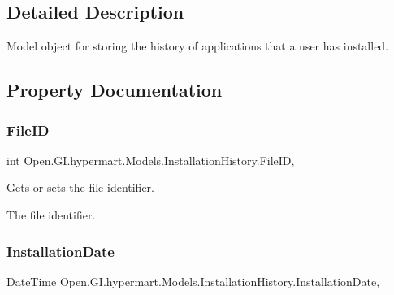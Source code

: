 \subsection{Detailed Description}
Model object for storing the history of applications that a user has installed. 



\subsection{Property Documentation}
\hypertarget{class_open_1_1_g_i_1_1hypermart_1_1_models_1_1_installation_history_ab0b9384f5250f31dc6120af767bfd6ff}{}\label{class_open_1_1_g_i_1_1hypermart_1_1_models_1_1_installation_history_ab0b9384f5250f31dc6120af767bfd6ff} 
\subsubsection{\texorpdfstring{File\+ID}{FileID}}
{\footnotesize\ttfamily int Open.\+G\+I.\+hypermart.\+Models.\+Installation\+History.\+File\+ID\hspace{0.3cm}{\ttfamily [get]}, {\ttfamily [set]}}



Gets or sets the file identifier. 

The file identifier. \hypertarget{class_open_1_1_g_i_1_1hypermart_1_1_models_1_1_installation_history_a6a5b73639b8fabacda9d9661de4ad89c}{}\label{class_open_1_1_g_i_1_1hypermart_1_1_models_1_1_installation_history_a6a5b73639b8fabacda9d9661de4ad89c} 
\subsubsection{\texorpdfstring{Installation\+Date}{InstallationDate}}
{\footnotesize\ttfamily Date\+Time Open.\+G\+I.\+hypermart.\+Models.\+Installation\+History.\+Installation\+Date\hspace{0.3cm}{\ttfamily [get]}, {\ttfamily [set]}}




